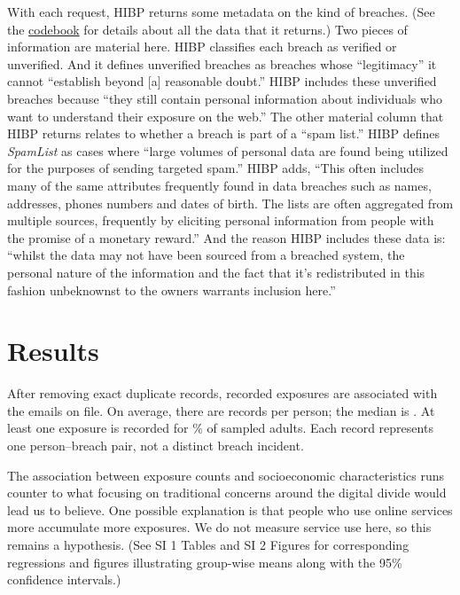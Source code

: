 \documentclass[sigconf]{acmart}
\begin{document}
With each request, HIBP returns some metadata on the kind of breaches. (See the \href{https://github.com/themains/pwned/blob/master/data/hibp_codebook.xlsx}{codebook} for details about all the data that it returns.) Two pieces of information are material here. HIBP classifies each breach as verified or unverified. And it defines unverified breaches as breaches whose ``legitimacy'' it cannot ``establish beyond [a] reasonable doubt.'' HIBP includes these unverified breaches because ``they still contain personal information about individuals who want to understand their exposure on the web.'' The other material column that HIBP returns relates to whether a breach is part of a ``spam list.'' HIBP defines {\it SpamList} as cases where ``large volumes of personal data are found being utilized for the purposes of sending targeted spam.'' HIBP adds, ``This often includes many of the same attributes frequently found in data breaches such as names, addresses, phones numbers and dates of birth. The lists are often aggregated from multiple sources, frequently by eliciting personal information from people with the promise of a monetary reward.'' And the reason HIBP includes these data is: ``whilst the data may not have been sourced from a breached system, the personal nature of the information and the fact that it's redistributed in this fashion unbeknownst to the owners warrants inclusion here.''

\section{Results}

After removing \duplicateCount{} exact duplicate records, \eventCount{} recorded exposures are associated with the \sampleSize{} emails on file. On average, there are \meanExposures{} records per person; the median is \medianExposures{}. At least one exposure is recorded for \exposedPercent{}\% of sampled adults. Each record represents one person--breach pair, not a distinct breach incident.

The association between exposure counts and socioeconomic characteristics runs counter to what focusing on traditional concerns around the digital divide would lead us to believe. One possible explanation is that people who use online services more accumulate more exposures. We do not measure service use here, so this remains a hypothesis. (See SI 1 Tables and SI 2 Figures for corresponding regressions and figures illustrating group-wise means along with the 95\% confidence intervals.)
\end{document}
